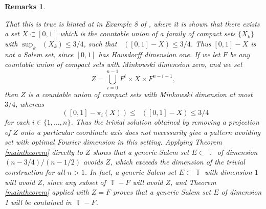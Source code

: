 \documentclass[dvipsnames,letterpaper,12pt]{article}
\numberwithin{equation}{section}
\DeclareMathOperator{\minkdim}{\dim_{\mathbb{M}}}
\DeclareMathOperator{\fordim}{\dim_{\mathbb{F}}}
\DeclareMathOperator{\TT}{\mathbb{T}}
\newtheorem{remarks}[theorem]{Remarks}
\numberwithin{theorem}{section}
\begin{document}
\begin{remarks}
\begin{enumerate}
        That this is true is hinted at in Example 8 of \cite{Ekstrom2014}, where it is shown that there exists a set $X \subset [0,1]$ which is the countable union of a family of compact sets $\{ X_k \}$ with $\sup_k \minkdim(X_k) \leq 3/4$, such that $\fordim([0,1] - X) \leq 3/4$. Thus $[0,1] - X$ is not a Salem set, since $[0,1]$ has Hausdorff dimension one. If we let $F$ be any countable union of compact sets with Minkowski dimension zero, and we set
        \[ Z = \bigcup_{i = 0}^{n-1} F^i \times X \times F^{n-i-1}, \]
        then $Z$ is a countable union of compact sets with Minkowski dimension at most $3/4$, whereas
        \[ \fordim([0,1] - \pi_i(X)) \leq \fordim([0,1] - X) \leq 3/4 \]
        for each $i \in \{ 1, \dots, n \}$. Thus the trivial solution obtained by removing a projection of $Z$ onto a particular coordinate axis does not necessarily give a pattern avoiding set with optimal Fourier dimension in this setting. Applying Theorem \ref{maintheorem} directly to $Z$ shows that a generic Salem set $E \subset \TT$ of dimension $(n-3/4)/(n-1/2)$ avoids $Z$, which exceeds the dimension of the trivial construction for all $n > 1$. In fact, a generic Salem set $E \subset \TT$ with dimension $1$ will avoid $Z$, since any subset of $\TT - F$ will avoid $Z$, and Theorem \ref{maintheorem} applied with $Z = F$ proves that a generic Salem set $E$ of dimension 1 will be contained in $\TT - F$.






\end{enumerate}
\end{remarks}
\end{document}
